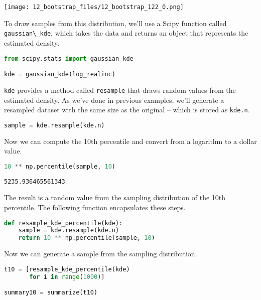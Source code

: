 \begin{center}
\texttt{[image: 12\_bootstrap\_files/12\_bootstrap\_122\_0.png]}
\end{center}

To draw samples from this distribution, we'll use a Scipy function
called \passthrough{\lstinline!gaussian\_kde!}, which takes the data and
returns an object that represents the estimated density.

\begin{lstlisting}[language=Python,style=source]
from scipy.stats import gaussian_kde

kde = gaussian_kde(log_realinc)
\end{lstlisting}

\passthrough{\lstinline!kde!} provides a method called
\passthrough{\lstinline!resample!} that draws random values from the
estimated density. As we've done in previous examples, we'll generate a
resampled dataset with the same size as the original -- which is stored
as \passthrough{\lstinline!kde.n!}.

\begin{lstlisting}[language=Python,style=source]
sample = kde.resample(kde.n)
\end{lstlisting}

Now we can compute the 10th percentile and convert from a logarithm to a
dollar value.

\begin{lstlisting}[language=Python,style=source]
10 ** np.percentile(sample, 10)
\end{lstlisting}

\begin{lstlisting}[style=output]
5235.936465561343
\end{lstlisting}

The result is a random value from the sampling distribution of the 10th
percentile. The following function encapsulates these steps.

\begin{lstlisting}[language=Python,style=source]
def resample_kde_percentile(kde):
    sample = kde.resample(kde.n)
    return 10 ** np.percentile(sample, 10)
\end{lstlisting}

Now we can generate a sample from the sampling distribution.

\begin{lstlisting}[language=Python,style=source]
t10 = [resample_kde_percentile(kde)
       for i in range(1000)]

summary10 = summarize(t10)
\end{lstlisting}

